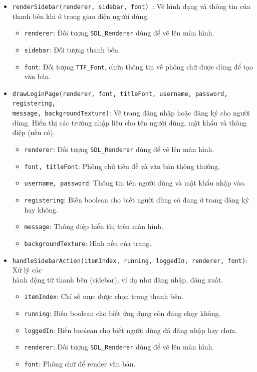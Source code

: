 \begin{itemize}
    \item \texttt{renderSidebar(renderer, sidebar, font) }: Vẽ hình dạng và thông tin của thanh bên khi ở trong giao diện người dùng.
    \begin{itemize}
        \item \texttt{renderer}: Đối tượng \texttt{SDL\_Renderer} dùng để vẽ lên màn hình.
        \item \texttt{sidebar}: Đối tượng thanh bên.
        \item \texttt{font}: Đối tượng \texttt{TTF\_Font}, chứa thông tin về phông chữ được dùng để tạo văn bản.
    \end{itemize}
    
    \item \texttt{drawLoginPage(renderer, font, titleFont, username, password, registering, \\message, backgroundTexture)}: Vẽ trang đăng nhập hoặc đăng ký cho người dùng. Hiển thị các trường nhập liệu cho tên người dùng, mật khẩu và thông điệp (nếu có).
    \begin{itemize}
        \item \texttt{renderer}: Đối tượng \texttt{SDL\_Renderer} dùng để vẽ lên màn hình.
        \item \texttt{font, titleFont}: Phông chữ tiêu đề và văn bản thông thường.
        \item \texttt{username, password}: Thông tin tên người dùng và mật khẩu nhập vào.
        \item \texttt{registering}: Biến boolean cho biết người dùng có đang ở trang đăng ký hay không.
        \item \texttt{message}: Thông điệp hiển thị trên màn hình.
        \item \texttt{backgroundTexture}: Hình nền của trang.
    \end{itemize}

    \item \texttt{handleSidebarAction(itemIndex, running, loggedIn, renderer, font)}: Xử lý các \\hành động từ thanh bên (sidebar), ví dụ như đăng nhập, đăng xuất.
    \begin{itemize}
        \item \texttt{itemIndex}: Chỉ số mục được chọn trong thanh bên.
        \item \texttt{running}: Biến boolean cho biết ứng dụng còn đang chạy không.
        \item \texttt{loggedIn}: Biến boolean cho biết người dùng đã đăng nhập hay chưa.
        \item \texttt{renderer}: Đối tượng \texttt{SDL\_Renderer} dùng để vẽ lên màn hình.
        \item \texttt{font}: Phông chữ để render văn bản.
    \end{itemize}


\end{itemize}
